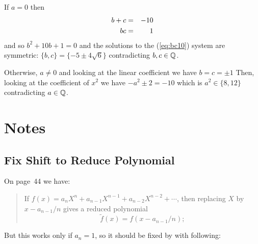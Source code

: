 \begin{myenumerate}
If \(a=0\) then
\begin{eqnarray} \label{eq:bc10}
b+c & = & -10 \\
bc  & = & 1 \notag
\end{eqnarray}
and so \(b^2+10b+1=0\) and the solutions to the (\ref{eq:bc10}) system
are symmetric: \(\{b,c\}=\{-5\pm4\sqrt{6}\}\)
contradicting \(b,c\in\mathbb{Q}\).

Otherwise, \(a\neq 0\)
and looking at the linear coefficient we have \(b=c=\pm 1\)
Then,  looking at the coefficient of \(x^2\) we have
\(-a^2 \pm 2 = -10\) which is \(a^2\in\{8,12\}\) contradicting \(a\in\mathbb{Q}\).

\end{myenumerate}


 \label{chap:class:formulas}

\section{Notes}

\subsection{Fix Shift to Reduce Polynomial}

On page~44 we have:
\begin{quotation}
\setcounter{quotelem}{42} %
  \begin{quotelem}
    If \(f(x) = a_nX^n + a_{n-1}X^{n-1} + a_{n-2}X^{n-2} + \cdots\),
    then replacing $X$ by \(x - a_{n-1}/n\) gives a reduced polynomial
    \begin{equation*}
      \tilde{f}(x) = f(x - a_{n-1}/n);
    \end{equation*}
    \mldots
  \end{quotelem}
\end{quotation}

But this works only if \(a_n = 1\), so it should be fixed by
with following:


